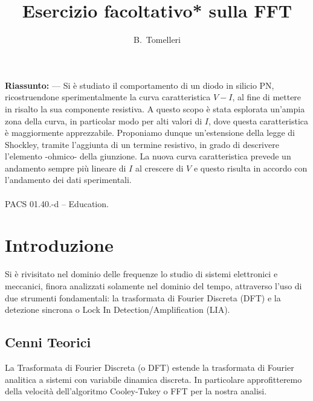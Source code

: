 \documentclass{article}[a4paper, oneside, 11pt]
\title{Esercizio facoltativo* sulla FFT}
\author{B.~Tomelleri \thanksdf}
\begin{document}
\maketitle

\begin{mdframed}
\textbf{Riassunto:} --- Si \`e studiato il comportamento di un diodo in silicio
PN, ricostruendone sperimentalmente la curva caratteristica $V-I$, al fine di
mettere in risalto la sua componente resistiva. A questo scopo \`e stata
esplorata un'ampia zona della curva, in particolar modo per alti valori di
$I$, dove questa caratteristica \`e maggiormente apprezzabile. Proponiamo dunque
un'estensione della legge di Shockley, tramite l'aggiunta di un termine
resistivo, in grado di descrivere l'elemento -ohmico- della giunzione.
La nuova curva caratteristica prevede un andamento sempre pi\`u lineare di $I$
al crescere di $V$ e questo risulta in accordo con l'andamento dei dati
sperimentali.
\\\\
PACS 01.40.-d – Education.\\
\end{mdframed}


\section{Introduzione}
Si è rivisitato nel dominio delle frequenze lo studio di sistemi elettronici
e meccanici, finora analizzati solamente nel dominio del tempo, attraverso l'uso
di due strumenti fondamentali: la trasformata di Fourier Discreta (DFT) e la
detezione sincrona o Lock In Detection/Amplification (LIA).
\subsection{Cenni Teorici}
La Trasformata di Fourier Discreta (o DFT) estende la trasformata di Fourier
analitica a sistemi con variabile dinamica discreta. In particolare
approfitteremo della velocità dell'algoritmo Cooley-Tukey \cite{FFT} o FFT
per la nostra analisi.
\end{document}
